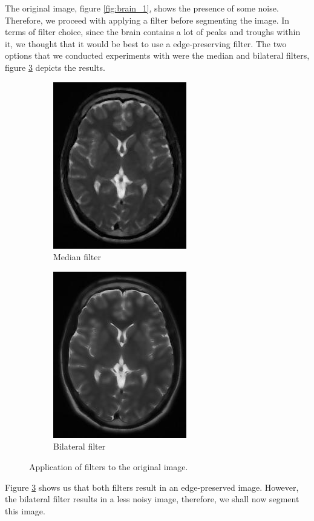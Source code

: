 \documentclass{article}
\begin{document}
\begin{flushleft}
The original image, figure \ref{fig:brain_1}, shows the presence of some noise. Therefore, we proceed with applying a filter before segmenting the image. In terms of filter choice, since the brain contains a lot of peaks and troughs within it, we thought that it would be best to use a edge-preserving filter. The two options that we conducted experiments with were the median and bilateral filters, figure \ref{fig:brain2} depicts the results. 
\end{flushleft}
\begin{figure}[H]
\centering
\begin{subfigure}{.5\textwidth}
  \centering
  \includegraphics[scale=0.6]{experiments/brain/brainMed.jpg}
  \caption{Median filter}
  \label{fig:brain_4}
\end{subfigure}%
\begin{subfigure}{.5\textwidth}
  \centering
  \includegraphics[scale=0.6]{experiments/brain/brainBil.jpg}
  \caption{Bilateral filter}
  \label{fig:brain_5}
\end{subfigure}
\caption{Application of filters to the original image.}
\label{fig:brain2}
\end{figure}
\begin{flushleft}
Figure \ref{fig:brain2} shows us that both filters result in an edge-preserved image. However, the bilateral filter results in a less noisy image, therefore, we shall now segment this image.
\end{flushleft}
\end{document}
